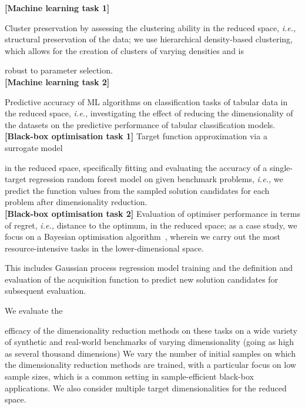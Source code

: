     \textbf{[Machine learning task 1]} 

    Cluster preservation by assessing the clustering ability in the reduced space, \emph{i.e.,} structural preservation of the data;
    we use hierarchical density-based clustering, which allows for the creation of clusters of varying densities and is 

    robust to parameter selection.\\ 


    \textbf{[Machine learning task 2]} 

    Predictive accuracy of ML algorithms on classification tasks of tabular data in the reduced space, \emph{i.e.,} investigating the effect of reducing the dimensionality of the datasets on the predictive performance of tabular classification models. \\
    \textbf{[Black-box optimisation task 1]}
    Target function approximation via a surrogate model

    in the reduced space, specifically fitting and evaluating the accuracy of a single-target regression random forest model on given benchmark problems, \emph{i.e.,} we predict the function values from the sampled solution candidates for each problem after dimensionality reduction.\\
    \textbf{[Black-box optimisation task 2]} Evaluation of optimiser performance in terms of regret, \emph{i.e.,} distance to the optimum, in the reduced space; as a case study, we focus on a Bayesian optimisation algorithm~\citep{Mockus12,Garnett23}, wherein we carry out the most resource-intensive tasks in the lower-dimensional space.

    This includes Gaussian process regression model training and the definition and evaluation of the acquisition function to predict new solution candidates for subsequent evaluation.






We evaluate the 

efficacy of the dimensionality reduction methods on these tasks on a wide variety of synthetic and real-world benchmarks of varying dimensionality (going as high as several thousand dimensions)
We vary the number of initial samples on which the dimensionality reduction methods are trained, with a particular focus on low sample sizes, which is a common setting in sample-efficient black-box applications.
We also consider multiple target dimensionalities for the reduced space.



